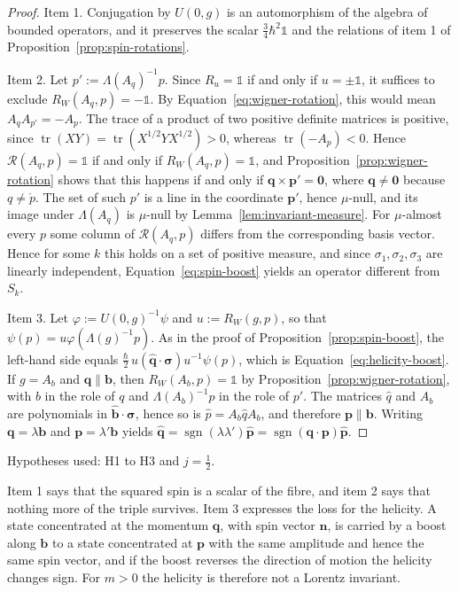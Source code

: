 \begin{proof}
	Item 1. Conjugation by $U(0,g)$ is an automorphism of the algebra of bounded operators, and it preserves the scalar $\frac34\hbar^2\mathbb{1}$ and the relations of item 1 of Proposition~\ref{prop:spin-rotations}.
	
	Item 2. Let $p':=\Lambda(A_q)^{-1}p$. Since $R_u=\mathbb{1}$ if and only if $u=\pm\mathbb{1}$, it suffices to exclude $R_W(A_q,p)=-\mathbb{1}$. By Equation~\eqref{eq:wigner-rotation}, this would mean $A_qA_{p'}=-A_p$. The trace of a product of two positive definite matrices is positive, since $\operatorname{tr}(XY)=\operatorname{tr}(X^{1/2}YX^{1/2})>0$, whereas $\operatorname{tr}(-A_p)<0$. Hence $\mathcal{R}(A_q,p)=\mathbb{1}$ if and only if $R_W(A_q,p)=\mathbb{1}$, and Proposition~\ref{prop:wigner-rotation} shows that this happens if and only if $\mathbf{q}\times\mathbf{p}'=\mathbf{0}$, where $\mathbf{q}\neq\mathbf{0}$ because $q\neq\mathring{p}$. The set of such $p'$ is a line in the coordinate $\mathbf{p}'$, hence $\mu$-null, and its image under $\Lambda(A_q)$ is $\mu$-null by Lemma~\ref{lem:invariant-measure}. For $\mu$-almost every $p$ some column of $\mathcal{R}(A_q,p)$ differs from the corresponding basis vector. Hence for some $k$ this holds on a set of positive measure, and since $\sigma_1,\sigma_2,\sigma_3$ are linearly independent, Equation~\eqref{eq:spin-boost} yields an operator different from $S_k$.
	
	Item 3. Let $\varphi:=U(0,g)^{-1}\psi$ and $u:=R_W(g,p)$, so that $\psi(p)=u\varphi(\Lambda(g)^{-1}p)$. As in the proof of Proposition~\ref{prop:spin-boost}, the left-hand side equals $\frac\hbar2\,u(\hat{\mathbf{q}}\cdot\boldsymbol{\sigma})u^{-1}\psi(p)$, which is Equation~\eqref{eq:helicity-boost}. If $g=A_b$ and $\mathbf{q}\parallel\mathbf{b}$, then $R_W(A_b,p)=\mathbb{1}$ by Proposition~\ref{prop:wigner-rotation}, with $b$ in the role of $q$ and $\Lambda(A_b)^{-1}p$ in the role of $p'$. The matrices $\hat{q}$ and $A_b$ are polynomials in $\hat{\mathbf{b}}\cdot\boldsymbol{\sigma}$, hence so is $\hat{p}=A_b\hat{q}A_b$, and therefore $\mathbf{p}\parallel\mathbf{b}$. Writing $\mathbf{q}=\lambda\mathbf{b}$ and $\mathbf{p}=\lambda'\mathbf{b}$ yields $\hat{\mathbf{q}}=\operatorname{sgn}(\lambda\lambda')\hat{\mathbf{p}}=\operatorname{sgn}(\mathbf{q}\cdot\mathbf{p})\hat{\mathbf{p}}$.
\end{proof}

\noindent Hypotheses used: H1 to H3 and $j=\frac12$.

Item 1 says that the squared spin is a scalar of the fibre, and item 2 says that nothing more of the triple survives. Item 3 expresses the loss for the helicity. A state concentrated at the momentum $\mathbf{q}$, with spin vector $\mathbf{n}$, is carried by a boost along $\mathbf{b}$ to a state concentrated at $\mathbf{p}$ with the same amplitude and hence the same spin vector, and if the boost reverses the direction of motion the helicity changes sign. For $m>0$ the helicity is therefore not a Lorentz invariant.

